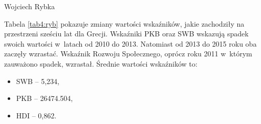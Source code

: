 \begin{artplenv}{Wojciech Rybka}
%

Tabela \ref{tab4:ryb} pokazuje zmiany wartości wskaźników, jakie zachodziły na przestrzeni sześciu lat dla Grecji. Wskaźniki PKB oraz
SWB wskazują spadek swoich wartości w~latach od 2010 do 2013. Natomiast od 2013 do 2015 roku oba zaczęły wzrastać.
Wskaźnik Rozwoju Społecznego, oprócz roku 2011 w~którym zauważono spadek, wzrastał. Średnie wartości wskaźników to:

\begin{itemize}
\item SWB -- 5,234,
\item PKB -- 26474.504,
\item HDI -- 0,862.
\end{itemize}



\end{artplenv}
